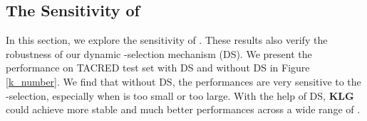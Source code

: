 \subsection{The Sensitivity of }
In this section, we explore the sensitivity of . These results also verify the robustness of our dynamic -selection mechanism (DS). We present the performance on TACRED test set with DS and without DS in Figure \ref{k_number}. We find that without DS, the performances are very sensitive to the -selection, especially when  is too small or too large. With the help of DS, \textbf{KLG} could achieve more stable and much better performances across a wide range of .


%
